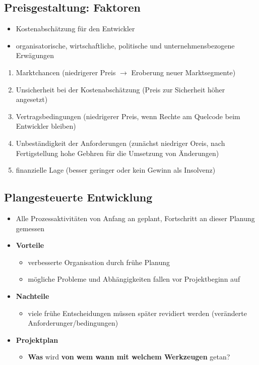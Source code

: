 \subsection{Preisgestaltung: Faktoren}
\begin{itemize}
    \item Kostenabschätzung für den Entwickler
    \item organisatorische, wirtschaftliche, politische und unternehmensbezogene Erwägungen
\end{itemize}
\begin{enumerate}
    \item Marktchancen (niedrigerer Preis $\rightarrow$ Eroberung neuer Marktsegmente)
    \item Unsicherheit bei der Kostenabschätzung (Preis zur Sicherheit höher angesetzt)
    \item Vertragsbedingungen (niedrigerer Preis, wenn Rechte am Quelcode beim Entwickler bleiben)
    \item Unbeständigkeit der Anforderungen (zunächst niedriger Oreis, nach Fertigstellung hohe Gebhren für die Umsetzung von Änderungen)
    \item finanzielle Lage (besser geringer oder kein Gewinn als Insolvenz)
\end{enumerate}

\subsection{Plangesteuerte Entwicklung}
\begin{itemize}
    \item Alle Prozessaktivitäten von Anfang an geplant, Fortschritt an dieser Planung gemessen
    \item \textbf{Vorteile}
    \begin{itemize}
        \item verbesserte Organisation durch frühe Planung 
        \item mögliche Probleme und Abhängigkeiten fallen vor Projektbeginn auf 
    \end{itemize}
    \item \textbf{Nachteile}
    \begin{itemize}
        \item viele frühe Entscheidungen müssen später revidiert werden (veränderte Anforderunger/bedingungen)
    \end{itemize}
    \item \textbf{Projektplan}
    \begin{itemize}
        \item \textbf{Was} wird \textbf{von wem wann mit welchem Werkzeugen} getan? 
    \end{itemize}
\end{itemize}

